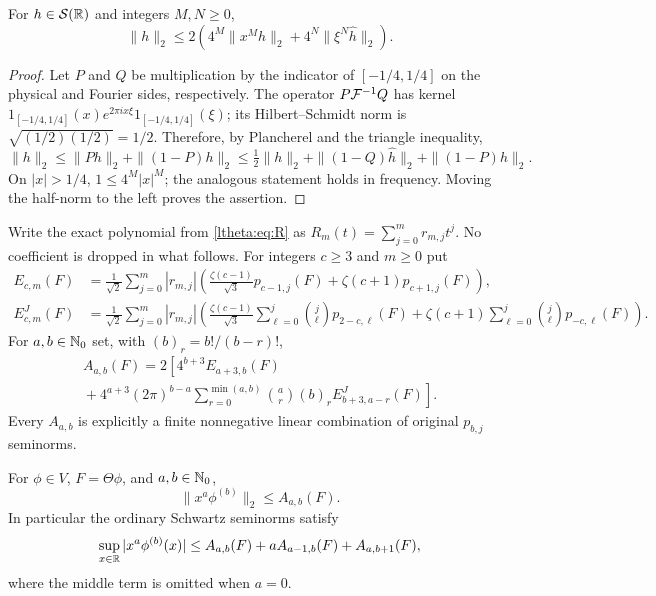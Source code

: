 \begin{lthetalemma}\label{ltheta:lem:uncertainty}
For $h\in\mathcal S(\mathbb R)$ and integers $M,N\geq0$,
\begin{equation}\label{ltheta:eq:uncertainty}
 \|h\|_2\leq2\left(4^M\|x^Mh\|_2
                         +4^N\|\xi^N\widehat h\|_2\right).
\end{equation}
\end{lthetalemma}

\begin{proof}
Let $P$ and $Q$ be multiplication by the indicator of $[-1/4,1/4]$
on the physical and Fourier sides, respectively. The operator
$P\mathcal F^{-1}Q$ has kernel $1_{[-1/4,1/4]}(x)
e^{2\pi i x\xi}1_{[-1/4,1/4]}(\xi)$; its Hilbert--Schmidt norm is
$\sqrt{(1/2)(1/2)}=1/2$. Therefore, by Plancherel and the triangle
inequality,
\[
 \|h\|_2\leq\|Ph\|_2+\|(1-P)h\|_2
 \leq\tfrac12\|h\|_2+\|(1-Q)\widehat h\|_2+\|(1-P)h\|_2.
\]
On $|x|>1/4$, $1\leq4^M|x|^M$; the analogous statement holds in
frequency. Moving the half-norm to the left proves the assertion.
\end{proof}

Write the exact polynomial from \eqref{ltheta:eq:R} as
$R_m(t)=\sum_{j=0}^m r_{m,j}t^j$. No coefficient is dropped in what
follows. For integers $c\geq3$ and $m\geq0$ put
\begin{align}
 E_{c,m}(F)&=\frac1{\sqrt2}\sum_{j=0}^m|r_{m,j}|
 \left(\frac{\zeta(c-1)}{\sqrt3}p_{c-1,j}(F)
                      +\zeta(c+1)p_{c+1,j}(F)\right),
                     \label{ltheta:eq:E}\\
 E^J_{c,m}(F)&=\frac1{\sqrt2}\sum_{j=0}^m|r_{m,j}|
 \left(\frac{\zeta(c-1)}{\sqrt3}
                     \sum_{\ell=0}^j\binom j\ell p_{2-c,\ell}(F)
       +\zeta(c+1)\sum_{\ell=0}^j\binom j\ell p_{-c,\ell}(F)\right).
                     \label{ltheta:eq:EJ}
\end{align}
For $a,b\in\mathbb N_0$ set, with $(b)_r=b!/(b-r)!$,
\begin{multline}\label{ltheta:eq:A}
 A_{a,b}(F)=2\left[4^{b+3}E_{a+3,b}(F)\right.\\
 \left.{}+4^{a+3}(2\pi)^{b-a}
 \sum_{r=0}^{\min(a,b)}\binom ar(b)_rE^J_{b+3,a-r}(F)\right].
\end{multline}
Every $A_{a,b}$ is explicitly a finite nonnegative linear combination
of original $p_{b,j}$ seminorms.

\begin{lthetaproposition}\label{ltheta:prop:inverse}
For $\phi\in V$, $F=\Theta\phi$, and $a,b\in\mathbb N_0$,
\begin{equation}\label{ltheta:eq:L2-inverse}
 \|x^a\phi^{(b)}\|_2\leq A_{a,b}(F).
\end{equation}
In particular the ordinary Schwartz seminorms satisfy
\begin{equation}\label{ltheta:eq:sup-inverse}
 \sup_{x\in\mathbb R}|x^a\phi^{(b)}(x)|
 \leq A_{a,b}(F)+aA_{a-1,b}(F)+A_{a,b+1}(F),
\end{equation}
where the middle term is omitted when $a=0$.
\end{lthetaproposition}

